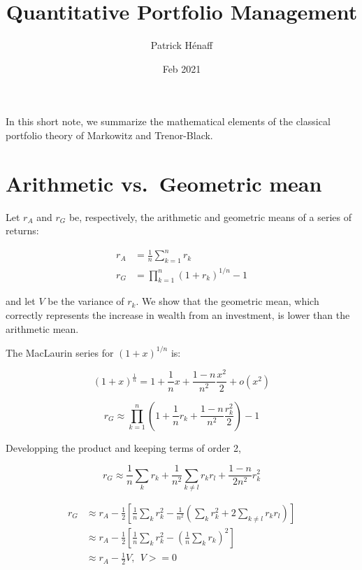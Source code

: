 \documentclass[
  11pt,
]{article}
\title{Quantitative Portfolio Management}
\author{Patrick Hénaff}
\date{Feb 2021}
\begin{document}
\maketitle

\newcommand{\ones}{\mathbf{1}}
\newcommand{\onesT}{\mathbf{1}^T}

\newtheorem{thm}{Theorem}

In this short note, we summarize the mathematical elements of the
classical portfolio theory of Markowitz and Trenor-Black.

\hypertarget{arithmetic-vs.-geometric-mean}{%
\section{Arithmetic vs.~Geometric
mean}\label{arithmetic-vs.-geometric-mean}}

Let \(r_A\) and \(r_G\) be, respectively, the arithmetic and geometric
means of a series of returns:

\begin{align*}
r_A &= \frac{1}{n} \sum_{k=1}^n r_k \\
r_G &= \prod_{k=1}^n (1+r_k)^{1/n} - 1
\end{align*}

and let \(V\) be the variance of \(r_k\). We show that the geometric
mean, which correctly represents the increase in wealth from an
investment, is lower than the arithmetic mean.

The MacLaurin series for \((1+x)^{1/n}\) is:

\[
(1+x)^\frac{1}{n} = 1 + \frac{1}{n} x + \frac{1-n}{n^2} \frac{x^2}{2} + o(x^2)
\]

\[
r_G \approx \prod_{k=1}^n \left(1 + \frac{1}{n} r_k + \frac{1-n}{n^2} \frac{r_k^2}{2} \right) - 1
\]

Developping the product and keeping terms of order 2,

\[
r_G \approx \frac{1}{n} \sum_k r_k + \frac{1}{n^2} \sum_{k \neq l} r_k r_l + \frac{1-n}{2n^2} r^2_k
\]

\begin{align}
r_G & \approx r_A - \frac{1}{2} \left[ \frac{1}{n} \sum_k r^2_k - \frac{1}{n^2} \left( \sum_k r^2_k + 2 \sum_{k \neq l} r_k r_l \right) \right] \\
& \approx r_A - \frac{1}{2} \left[ \frac{1}{n} \sum_k r^2_k - \left(  \frac{1}{n} \sum_k r_k  \right)^2 \right] \\
& \approx r_A - \frac{1}{2} V, \ \ V >= 0
\end{align}
\end{document}
